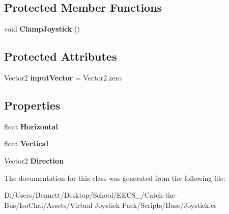 \subsection*{Protected Member Functions}
\begin{DoxyCompactItemize}
\item 
\mbox{\label{class_joystick_a1a25fbacf5d6c6275abda7f8c29d0e0c}} 
void {\bfseries Clamp\+Joystick} ()
\end{DoxyCompactItemize}
\subsection*{Protected Attributes}
\begin{DoxyCompactItemize}
\item 
\mbox{\label{class_joystick_a8b1dd8b1874e78a0a2781a847c2cd768}} 
Vector2 {\bfseries input\+Vector} = Vector2.\+zero
\end{DoxyCompactItemize}
\subsection*{Properties}
\begin{DoxyCompactItemize}
\item 
\mbox{\label{class_joystick_aa96a7d4d3f9c4b3d79747b0fb4a0d4f7}} 
float {\bfseries Horizontal}
\item 
\mbox{\label{class_joystick_aaa4ab10e8e5f17095b192a64eb3f65c9}} 
float {\bfseries Vertical}
\item 
\mbox{\label{class_joystick_a7c7c6bc3ace9d2014e2b7f8234e979ea}} 
Vector2 {\bfseries Direction}
\end{DoxyCompactItemize}


The documentation for this class was generated from the following file\+:\begin{DoxyCompactItemize}
\item 
D\+:/\+Users/\+Bennett/\+Desktop/\+School/\+E\+E\+C\+S\+\_/\+Catch-\/the-\/\+Bus/\+Iso\+Chai/\+Assets/\+Virtual Joystick Pack/\+Scripts/\+Base/Joystick.\+cs\end{DoxyCompactItemize}

